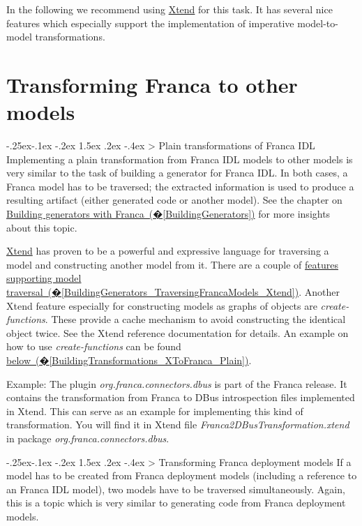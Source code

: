 \documentclass[a4paper,10pt]{scrreprt}
\makeatletter
\renewcommand\subsection{\medskip\@startsection{subsection}{2}{\z@}%
  {-.25ex\@plus -.1ex \@minus -.2ex}%
  {1.5ex \@plus .2ex \@minus -.4ex}%
  {\ifnum \scr@compatibility>\@nameuse{scr@v@2.96}\relax
    \setlength{\parfillskip}{\z@ plus 1fil}\fi
    \raggedsection\normalfont\sectfont\nobreak\size@subsection
  }%
}
\makeatother
\begin{document}
In the following we recommend using \href{http://xtend-lang.org}{Xtend} for this task.
It has several nice features which especially support the implementation of
imperative model-to-model transformations.

\section{Transforming Franca to other models}
\label{BuildingTransformations_FrancaToX}
\subsection{Plain transformations of Franca IDL}
\label{BuildingTransformations_FrancaToX_Plain}
Implementing a plain transformation from Franca IDL models to other models is very similar to
the task of building a generator for Franca IDL. In both cases, a Franca model has to be 
traversed; the extracted information is used to produce a resulting artifact (either generated
code or another model). See the chapter on \hyperref[BuildingGenerators]{Building generators with Franca~(�\ref*{BuildingGenerators})}
for more insights about this topic.

\href{http://xtend-lang.org}{Xtend} has proven to be a powerful and expressive language for
traversing a model and constructing another model from it. There are a couple of
\hyperref[BuildingGenerators_TraversingFrancaModels_Xtend]{features supporting model traversal~(�\ref*{BuildingGenerators_TraversingFrancaModels_Xtend})}.
Another Xtend feature especially for constructing models as graphs of objects are
\textit{create-functions}. These provide a cache mechanism to avoid constructing the identical
object twice. See the Xtend reference documentation for details. An example on how
to use \textit{create-functions} can be found \hyperref[BuildingTransformations_XToFranca_Plain]{below~(�\ref*{BuildingTransformations_XToFranca_Plain})}.

Example: The plugin \textit{org.franca.connectors.dbus} is part of the Franca release. It contains
the transformation from Franca to DBus introspection files implemented in Xtend.
This can serve as an example for implementing this kind of transformation.
You will find it in Xtend file \textit{Franca2DBusTransformation.xtend} in package
\textit{org.franca.connectors.dbus}.

\subsection{Transforming Franca deployment models}
\label{BuildingTransformations_FrancaToX_WithDeployment}
If a model has to be created from Franca deployment models (including a reference to
an Franca IDL model), two models have to be traversed simultaneously. Again, this is 
a topic which is very similar to generating code from Franca deployment models.
\end{document}
